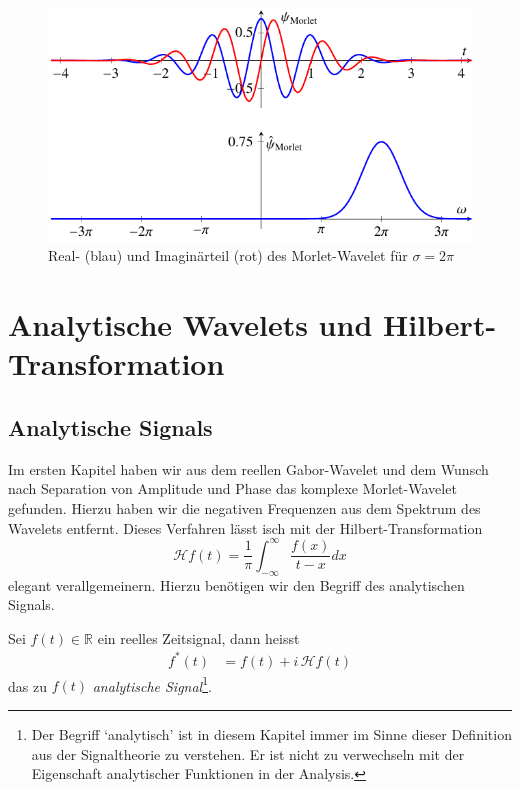 \begin{refsection}
\begin{figure}
	\centering
	\includegraphics{papers/complex/images/morlet.pdf}
	\caption{Real- (blau) und Imaginärteil (rot) des Morlet-Wavelet für $\sigma = 2\pi$ \label{complex:morlet}}
\end{figure}


\section{Analytische Wavelets und Hilbert-Transformation}
\subsection{Analytische Signals}
Im ersten Kapitel haben wir aus dem reellen Gabor-Wavelet und dem Wunsch nach Separation von Amplitude und Phase das komplexe Morlet-Wavelet gefunden.
Hierzu haben wir die negativen Frequenzen aus dem Spektrum des Wavelets entfernt.
Dieses Verfahren lässt isch mit der Hilbert-Transformation
\[
	\mathcal{H}f(t) =
	\frac{1}{\pi}\int_{-\infty}^{\infty}\frac{f(x)}{t-x} dx
\]
elegant verallgemeinern.
Hierzu benötigen wir den Begriff des analytischen Signals.
\begin{definition}
	Sei $f(t) \in \mathbb{R}$ ein reelles Zeitsignal, dann heisst
	\begin{align*}
		f^\ast(t) 
		&= f(t) + i\,\mathcal{H}f(t)
	\end{align*}
	das zu $f(t)$ \emph{analytische Signal}\footnote{Der Begriff `analytisch' ist in diesem Kapitel immer im Sinne dieser Definition aus der Signaltheorie zu verstehen.
	Er ist nicht zu verwechseln mit der Eigenschaft analytischer Funktionen in der Analysis.
	}.
\end{definition}


\end{refsection}

